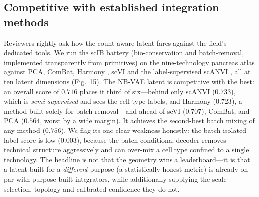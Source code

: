 \documentclass[11pt]{article}
\newcommand{\bnigmc}{0.716}     %
\newcommand{\bnscanvi}{0.733}   %
\newcommand{\bnharmony}{0.723}  %
\newcommand{\bnscvi}{0.707}     %
\newcommand{\bnpca}{0.564}      %
\newcommand{\bnigmcbatch}{0.756}%
\begin{document}
\subsection{Competitive with established integration methods}
Reviewers rightly ask how the count-aware latent fares against the field's dedicated tools. We run the
scIB battery (bio-conservation and batch-removal, implemented transparently from primitives) on the
nine-technology pancreas atlas against PCA, ComBat, Harmony \citep{korsunsky2019harmony}, scVI and the
label-supervised scANVI \citep{lopez2018scvi,gayoso2022scvitools}, all at ten latent dimensions
(Fig.~15). The NB-VAE latent is competitive with the best: an overall score of $\bnigmc$ places it
third of six---behind only scANVI ($\bnscanvi$), which is \emph{semi-supervised} and sees the cell-type
labels, and Harmony ($\bnharmony$), a method built solely for batch removal---and ahead of scVI
($\bnscvi$), ComBat, and PCA ($\bnpca$, worst by a wide margin). It achieves the second-best batch
mixing of any method ($\bnigmcbatch$). We flag its one clear weakness honestly: the batch-isolated-label
score is low ($0.003$), because the batch-conditional decoder removes technical structure aggressively
and can over-mix a cell type confined to a single technology. The headline is not that the geometry
wins a leaderboard---it is that a latent built for a \emph{different} purpose (a statistically honest
metric) is already on par with purpose-built integrators, while additionally supplying the scale
selection, topology and calibrated confidence they do not.
\end{document}
